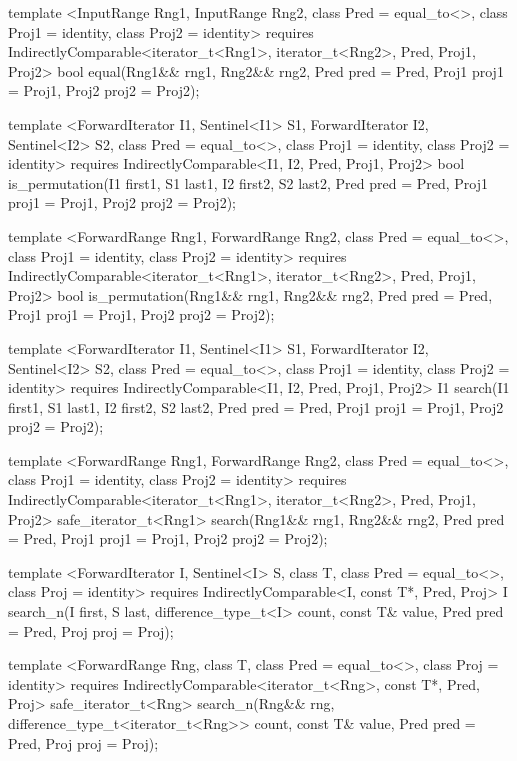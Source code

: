 \begin{codeblock}
{{{{  template <InputRange Rng1, InputRange Rng2, class Pred = equal_to<>,
      class Proj1 = identity, class Proj2 = identity>
    requires IndirectlyComparable<iterator_t<Rng1>, iterator_t<Rng2>, Pred, Proj1, Proj2>
    bool equal(Rng1&& rng1, Rng2&& rng2, Pred pred = Pred{},
               Proj1 proj1 = Proj1{}, Proj2 proj2 = Proj2{});


  template <ForwardIterator I1, Sentinel<I1> S1, ForwardIterator I2,
      Sentinel<I2> S2, class Pred = equal_to<>, class Proj1 = identity,
      class Proj2 = identity>
    requires IndirectlyComparable<I1, I2, Pred, Proj1, Proj2>
    bool is_permutation(I1 first1, S1 last1, I2 first2, S2 last2,
                        Pred pred = Pred{},
                        Proj1 proj1 = Proj1{}, Proj2 proj2 = Proj2{});

  template <ForwardRange Rng1, ForwardRange Rng2, class Pred = equal_to<>,
      class Proj1 = identity, class Proj2 = identity>
    requires IndirectlyComparable<iterator_t<Rng1>, iterator_t<Rng2>, Pred, Proj1, Proj2>
    bool is_permutation(Rng1&& rng1, Rng2&& rng2, Pred pred = Pred{},
                        Proj1 proj1 = Proj1{}, Proj2 proj2 = Proj2{});

  template <ForwardIterator I1, Sentinel<I1> S1, ForwardIterator I2,
      Sentinel<I2> S2, class Pred = equal_to<>,
      class Proj1 = identity, class Proj2 = identity>
    requires IndirectlyComparable<I1, I2, Pred, Proj1, Proj2>
    I1
      search(I1 first1, S1 last1, I2 first2, S2 last2,
             Pred pred = Pred{},
             Proj1 proj1 = Proj1{}, Proj2 proj2 = Proj2{});

  template <ForwardRange Rng1, ForwardRange Rng2, class Pred = equal_to<>,
      class Proj1 = identity, class Proj2 = identity>
    requires IndirectlyComparable<iterator_t<Rng1>, iterator_t<Rng2>, Pred, Proj1, Proj2>
    safe_iterator_t<Rng1>
      search(Rng1&& rng1, Rng2&& rng2, Pred pred = Pred{},
             Proj1 proj1 = Proj1{}, Proj2 proj2 = Proj2{});

  template <ForwardIterator I, Sentinel<I> S, class T,
      class Pred = equal_to<>, class Proj = identity>
    requires IndirectlyComparable<I, const T*, Pred, Proj>
    I
      search_n(I first, S last, difference_type_t<I> count,
               const T& value, Pred pred = Pred{},
               Proj proj = Proj{});

  template <ForwardRange Rng, class T, class Pred = equal_to<>,
      class Proj = identity>
    requires IndirectlyComparable<iterator_t<Rng>, const T*, Pred, Proj>
    safe_iterator_t<Rng>
      search_n(Rng&& rng, difference_type_t<iterator_t<Rng>> count,
               const T& value, Pred pred = Pred{}, Proj proj = Proj{});

}}}}
\end{codeblock}
